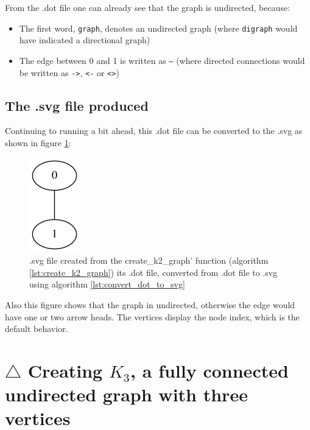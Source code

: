 From the .dot file one can already see that the graph is undirected, because:

\begin{itemize}
  \item The first word, \verb;graph;, denotes an undirected graph 
    (where \verb;digraph; would have indicated a directional graph)
  \item The edge between 0 and 1 is written as \verb;–; 
    (where directed connections would be written as \verb;->;, 
    \verb;<-; or \verb;<>;)
\end{itemize}

\subsection{The .svg file produced}
\label{subsec:create_k2.svg}

Continuing to running a bit ahead, 
this .dot file can be converted to the .svg 
as shown in figure \ref{fig:create_k2_graph.svg}:

\begin{figure}[!htbp]
  \includegraphics[]{create_k2_graph.png}
  \caption{.svg file created from the create\_k2\_graph' function (algorithm \ref{lst:create_k2_graph}) its .dot file, converted from .dot file to .svg using algorithm \ref{lst:convert_dot_to_svg}}
  \label{fig:create_k2_graph.svg}
\end{figure}

Also this figure shows that the graph in undirected, otherwise the edge
 would have one or two arrow heads.
 The vertices display the node index, which is the default behavior.

\section{$\triangle$ Creating $K_{3}$, a fully connected undirected graph with three vertices}
\label{subsec:create_k3_graph}

